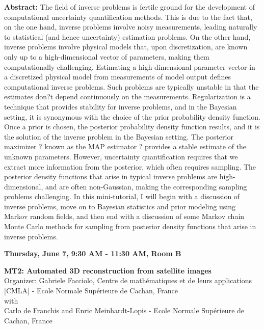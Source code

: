 \textbf{Abstract:} 
The field of inverse problems is fertile ground for the development of computational uncertainty quantification methods. This is due to the fact that, on the one hand, inverse problems involve noisy measurements, leading naturally to statistical (and hence uncertainty) estimation problems. On the other hand, inverse problems involve physical models that, upon discretization, are known only up to a high-dimensional vector of parameters, making them computationally challenging. Estimating a high-dimensional parameter vector in a discretized physical model from measurements of model output defines computational inverse problems. Such problems are typically unstable in that the estimates don?t depend continuously on the measurements. Regularization is a technique that provides stability for inverse problems, and in the Bayesian setting, it is synonymous with the choice of the prior probability density function. Once a prior is chosen, the posterior probability density function results, and it is the solution of the inverse problem in the Bayesian setting. The posterior maximizer ? known as the MAP estimator ? provides a stable estimate of the unknown parameters. However, uncertainty quantification requires that we extract more information from the posterior, which often requires sampling. The posterior density functions that arise in typical inverse problems are high-dimensional, and are often non-Gaussian, making the corresponding sampling problems challenging. In this mini-tutorial, I will begin with a discussion of inverse problems, move on to Bayesian statistics and prior modeling using Markov random fields, and then end with a discussion of some Markov chain Monte Carlo methods for sampling from posterior density functions that arise in inverse problems. 


\vspace{2cm}
\begin{center}\textbf{Thursday, June 7, 9:30 AM - 11:30 AM, Room B}\end{center}
\begin{center}
\textbf{MT2: Automated 3D reconstruction from satellite images}\\
Organizer: Gabriele Facciolo, Centre de math\'ematiques et de leurs applications [CMLA] - Ecole Normale Sup\'erieure de Cachan, France\\
with\\ Carlo de Franchis and Enric Meinhardt-Lopis - Ecole Normale Sup\'erieure de Cachan, France
\end{center}

